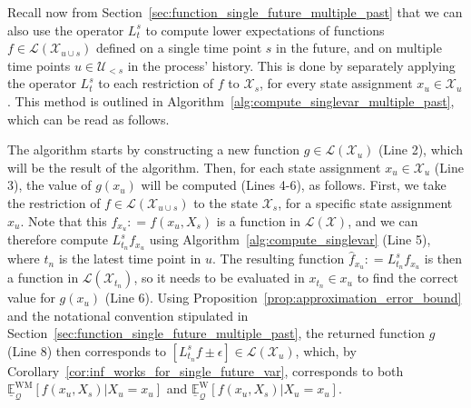 \documentclass[10pt,a4paper]{paper}
\theoremstyle{definition}
\newcommand{\states}{\mathcal{X}}
\newcommand{\gambles}{\mathcal{L}}
\newcommand{\gamblesX}{\gambles(\states)}
\newcommand{\rateset}{\mathcal{Q}}
\newcommand{\coloneqq}{:\!=}
\begin{document}
Recall now from Section~\ref{sec:function_single_future_multiple_past} that we can also use the operator $L_t^s$ to compute lower expectations of functions $f\in\gambles(\states_{u\cup s})$ defined on a single time point $s$ in the future, and on multiple time points $u\in\mathcal{U}_{<s}$ in the process' history. This is done by separately applying the operator $L_t^s$ to each restriction of $f$ to $\states_s$, for every state assignment $x_u\in\states_u$. This method is outlined in Algorithm~\ref{alg:compute_singlevar_multiple_past}, which can be read as follows. 

The algorithm starts by constructing a new function $g\in\gambles(\states_u)$ (Line 2), which will be the result of the algorithm. Then, for each state assignment $x_u\in\states_u$ (Line 3), the value of $g(x_u)$ will be computed (Lines 4-6), as follows. First, we take the restriction of $f\in\gambles(\states_{u\cup s})$ to the state $\states_s$, for a specific state assignment $x_u$. Note that this $f_{x_u}\coloneqq f(x_u,X_s)$ is a function in $\gamblesX$, and we can therefore compute $L_{t_n}^sf_{x_u}$ using Algorithm~\ref{alg:compute_singlevar} (Line 5), where $t_n$ is the latest time point in $u$. The resulting function $\hat{f}_{x_u}\coloneqq L_{t_n}^sf_{x_u}$ is then a function in $\gambles(\states_{t_n})$, so it needs to be evaluated in $x_{t_n}\in x_u$ to find the correct value for $g(x_u)$ (Line 6). Using Proposition~\ref{prop:approximation_error_bound} and the notational convention stipulated in Section~\ref{sec:function_single_future_multiple_past}, the returned function $g$ (Line 8) then corresponds to $[L_{t_n}^sf \pm\epsilon]\in\gambles(\states_u)$, which, by Corollary~\ref{cor:inf_works_for_single_future_var}, corresponds to both $\underline{\mathbb{E}}_{\rateset}^\mathrm{WM}[f(x_u,X_s)\vert X_u=x_u]$ and $\underline{\mathbb{E}}_{\rateset}^\mathrm{W}[f(x_u,X_s)\vert X_u=x_u]$.
\end{document}
